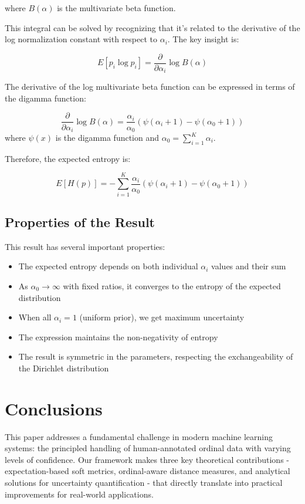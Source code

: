\documentclass[journal]{IEEEtran}
\begin{document}
where $B(\alpha)$ is the multivariate beta function.

This integral can be solved by recognizing that it's related to the derivative of the log normalization constant with respect to $\alpha_i$. The key insight is:

\begin{equation}
E[p_i \log p_i] = \frac{\partial}{\partial \alpha_i} \log B(\alpha)
\end{equation}

The derivative of the log multivariate beta function can be expressed in terms of the digamma function:

\begin{equation}
\frac{\partial}{\partial \alpha_i} \log B(\alpha) = \frac{\alpha_i}{\alpha_0}(\psi(\alpha_i + 1) - \psi(\alpha_0 + 1))
\end{equation}
where $\psi(x)$ is the digamma function and $\alpha_0 = \sum_{i=1}^K \alpha_i$.

Therefore, the expected entropy is:

\begin{equation}
E[H(p)] = -\sum_{i=1}^K \frac{\alpha_i}{\alpha_0}(\psi(\alpha_i + 1) - \psi(\alpha_0 + 1))
\end{equation}

\subsection{Properties of the Result}
This result has several important properties:
\begin{itemize}
\item The expected entropy depends on both individual $\alpha_i$ values and their sum
\item As $\alpha_0 \to \infty$ with fixed ratios, it converges to the entropy of the expected distribution
\item When all $\alpha_i = 1$ (uniform prior), we get maximum uncertainty
\item The expression maintains the non-negativity of entropy
\item The result is symmetric in the parameters, respecting the exchangeability of the Dirichlet distribution
\end{itemize}

\section{Conclusions}

This paper addresses a fundamental challenge in modern machine learning systems: the principled handling of human-annotated ordinal data with varying levels of confidence. Our framework makes three key theoretical contributions - expectation-based soft metrics, ordinal-aware distance measures, and analytical solutions for uncertainty quantification - that directly translate into practical improvements for real-world applications.
\end{document}
